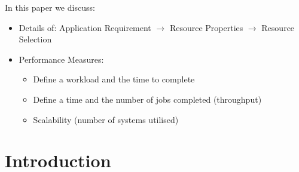 \documentclass[conference,final]{IEEEtran}
\begin{document}
In this paper we discuss:
\begin{itemize} 
\item Details of: Application Requirement $\rightarrow$ Resource Properties 
$\rightarrow$ Resource Selection
\item Performance Measures:
  \begin{itemize}
\item Define a workload and the time to complete 
\item Define a time and the number of jobs completed (throughput)
\item Scalability (number of systems utilised)
\end{itemize} 
\end{itemize} 

\section{Introduction}
\end{document}
